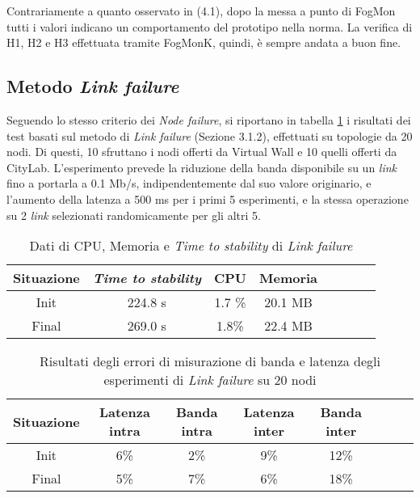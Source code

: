         Contrariamente a quanto osservato in (4.1), dopo la messa a punto di FogMon tutti i valori indicano un comportamento del prototipo nella norma. La verifica di H1, H2 e H3  effettuata tramite FogMonK, quindi, è sempre andata a buon fine.
        \subsection{Metodo \textit{Link failure}}
        Seguendo lo stesso criterio dei \textit{Node failure}, si riportano in tabella \ref{tab:linkfail} i risultati dei test basati sul metodo di \textit{Link failure} (Sezione 3.1.2), effettuati su topologie da 20 nodi. Di questi, 10 sfruttano i nodi offerti da Virtual Wall e 10 quelli offerti da CityLab. L'esperimento prevede la riduzione della banda disponibile su un \textit{link} fino a portarla a 0.1 Mb/s, indipendentemente dal suo valore originario, e l'aumento della latenza a 500 ms per i primi 5 esperimenti, e la stessa operazione su 2 \textit{link} selezionati randomicamente per gli altri 5.
        
        \begin{table}[H]
            \caption{Dati di CPU, Memoria e \textit{Time to stability} di \textit{Link failure}}
            \label{tab:linkfail}
            \begin{center}
                \begin{tabular}{|c|c|c|c|c|c|c|c|}
                     \hline
                    Situazione & \textit{Time to stability} & CPU & Memoria\\
                    \hline
                    Init & 224.8 s & 1.7 \% & 20.1 MB\\
                    \hline
                    Final & 269.0 s & 1.8\% & 22.4 MB\\
                    \hline
                \end{tabular}
            \end{center}
        \end{table}
        
        \begin{table}[H]
            \caption{Risultati degli errori di misurazione di banda e latenza degli esperimenti di \textit{Link failure} su 20 nodi}
            \label{tab:linkfail20qos}
            \begin{center}
                \begin{tabular}{|c|c|c|c|c|c|c|c|}
                    \hline
                    Situazione & Latenza intra & Banda intra & Latenza inter & Banda inter\\
                    \hline
                    Init & 6\% &  2\%  & 9\% &  12\%\\
                    \hline
                    Final & 5\% &  7\%  &  6\% &  18\%\\
                    \hline
                \end{tabular}
            \end{center}
        \end{table}
        
